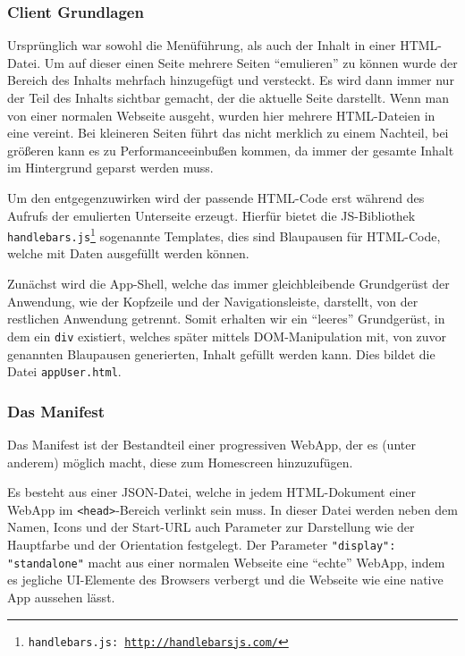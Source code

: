 \documentclass[a4paper,12pt,ngerman,listof=numbered]{scrartcl}      %
\providecommand{\inlinecode}[1]{\texttt{#1}}
\begin{document}
	\subsubsection{Client Grundlagen}
	Ursprünglich war sowohl die Me\-nü\-füh\-rung, als auch der Inhalt in einer HTML-Datei. Um auf dieser einen Seite mehrere Seiten ``emulieren'' zu können wurde der Bereich des Inhalts mehrfach hinzugefügt und versteckt. Es wird dann immer nur der Teil des Inhalts sichtbar gemacht, der die aktuelle Seite darstellt. Wenn man von einer normalen Webseite ausgeht, wurden hier mehrere HTML-Dateien in eine vereint. Bei kleineren Seiten führt das nicht merklich zu einem Nachteil, bei größeren kann es zu Performanceeinbußen kommen, da immer der gesamte Inhalt im Hintergrund geparst werden muss.\par
	Um den entgegenzuwirken wird der passende HTML-Code erst während des Aufrufs der emulierten Unterseite erzeugt. Hierfür bietet die JS-Bibliothek \inlinecode{handle\-bars.js\footnote{\inlinecode{handlebars.js}: \url{http://handlebarsjs.com/}}} sogenannte Templates, dies sind Blaupausen für HTML-Code, welche mit Daten ausgefüllt werden können.\par
	Zunächst wird die App-Shell, welche das immer gleichbleibende Grundgerüst der Anwendung, wie der Kopfzeile und der Navigations\-leiste, darstellt, von der restlichen Anwendung getrennt. Somit erhalten wir ein ``leeres'' Grundgerüst, in dem ein \inlinecode{div} existiert, welches später mittels DOM-Manipulation mit, von zuvor genannten Blaupausen generierten, Inhalt gefüllt werden kann. Dies bildet die Datei \inlinecode{appUser.html}.\par
	
	\subsubsection{Das Manifest}
	Das Manifest ist der Bestandteil einer progressiven WebApp, der es (unter anderem) möglich macht, diese zum Homescreen hinzuzufügen.\par
	Es besteht aus einer JSON-Datei, welche in jedem HTML-Dokument einer WebApp im \inlinecode{<head>}-Bereich verlinkt sein muss. In dieser Datei werden neben dem Namen, Icons und der Start-URL auch Parameter zur Darstellung wie der Hauptfarbe und der Orientation festgelegt. Der Parameter \inlinecode{"{}display"{}: "{}standalone"{}} macht aus einer normalen Webseite eine ``echte'' WebApp, indem es jegliche UI-Elemente des Browsers verbergt und die Webseite wie eine native App aussehen lässt.\par
	
\end{document}
